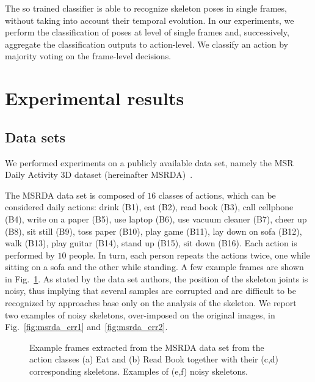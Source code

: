 \documentclass[runningheads,a4paper]{llncs}
\begin{document}
The so trained classifier is able to recognize skeleton poses in single frames, without taking into account their temporal evolution. In our experiments, we perform the classification of poses at level of single frames and, successively, aggregate the classification outputs to action-level. We classify an action by majority voting on the frame-level decisions.

\section{Experimental results}
\label{sec:exp}

\subsection{Data sets}
We performed experiments on a publicly available data set, namely the MSR Daily Activity 3D dataset (hereinafter MSRDA)~\cite{Wu12_dataset}.

The MSRDA data set is composed of $16$ classes of actions, which can be considered daily actions: drink (B1), eat (B2), read book (B3), call cellphone (B4), write on a paper (B5), use laptop (B6), use vacuum cleaner (B7), cheer up (B8), sit still (B9), toss paper (B10), play game (B11), lay down on sofa (B12), walk (B13), play guitar (B14), stand up (B15), sit down (B16). 
Each action is performed by $10$ people. In turn, each person repeats the actions twice, one while sitting on a sofa and the other while standing. A few example frames are shown in Fig.~\ref{fig:dataset_msrda}.
As stated by the data set authors, the position of the skeleton joints is  noisy, thus implying that several samples are corrupted and are difficult to be recognized by approaches base only on the analysis of the skeleton. We report two examples of noisy skeletons, over-imposed on the original images, in Fig.~\ref{fig:msrda_err1} and~\ref{fig:msrda_err2}.

\begin{figure}[!t]
   \centering
             \setlength{\unitlength}{35mm}



   \caption{Example frames extracted from the MSRDA data set from the action classes (a) Eat  and  (b) Read Book together with their (c,d) corresponding skeletons. Examples of (e,f) noisy skeletons.}
   \label{fig:dataset_msrda}
\end{figure}
\end{document}

